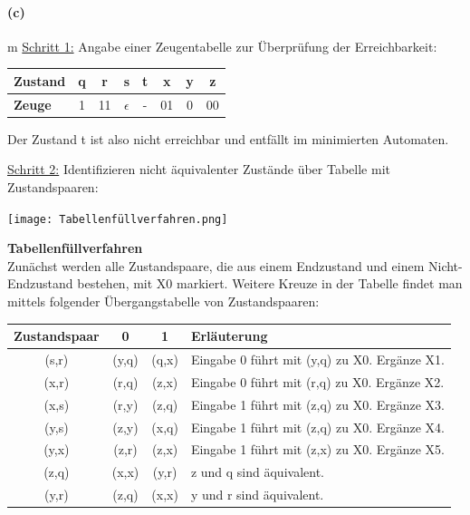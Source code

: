 \paragraph{(c)}m
	\underline{Schritt 1:} Angabe einer Zeugentabelle zur Überprüfung der Erreichbarkeit:

	\begin{tabular}{l|ccccccc}
		\textbf{Zustand} & q & r  & s          & t & x  & y & z \\
		\hline
		\textbf{Zeuge}   & 1 & 11 & $\epsilon$ & - & 01 & 0 & 00 \\
	\end{tabular} 
	
	Der Zustand t ist also nicht erreichbar und entfällt im minimierten Automaten.
	
	\underline{Schritt 2:} Identifizieren nicht äquivalenter Zustände über Tabelle mit Zustandspaaren:
	
	\texttt{[image: Tabellenfüllverfahren.png]}

	\textbf{Tabellenfüllverfahren} \\
	Zunächst werden alle Zustandspaare, die aus einem Endzustand und einem Nicht-Endzustand bestehen, mit X0 markiert. Weitere Kreuze in der Tabelle findet man mittels folgender Übergangstabelle von Zustandspaaren:

	\begin{tabular}{c|c|c|l}
		\textbf{Zustandspaar} & \textbf{0} & \textbf{1} & \textbf{Erläuterung} \\
		\hline
		(s,r)                 & (y,q)      & (q,x)      & Eingabe 0 führt mit (y,q) zu X0. Ergänze X1. \\
		\hline
		(x,r)                 & (r,q)      & (z,x)      & Eingabe 0 führt mit (r,q) zu X0. Ergänze X2. \\
		\hline
		(x,s)                 & (r,y)      & (z,q)      & Eingabe 1 führt mit (z,q) zu X0. Ergänze X3. \\
		\hline
		(y,s)                 & (z,y)      & (x,q)      & Eingabe 1 führt mit (z,q) zu X0. Ergänze X4. \\
		\hline
		(y,x)                 & (z,r)      & (z,x)      & Eingabe 1 führt mit (z,x) zu X0. Ergänze X5. \\
		\hline
		(z,q)                 & (x,x)      & (y,r)      & z und q sind äquivalent. \\
		\hline 		
		(y,r)                 & (z,q)      & (x,x)      & y und r sind äquivalent. \\
	\end{tabular} 
	
